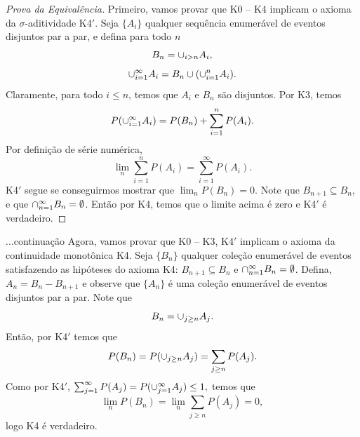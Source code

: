 %
%
%
\begin{frame}
\begin{proof}[Prova da Equivalência]
Primeiro, vamos provar que K0 -- K4 implicam o axioma da
$\sigma$-aditividade K4$'$. Seja $\{A_i\}$ qualquer sequência
enumerável de eventos disjuntos par a par, e defina para todo $n$
$$B_n=\cup_{i>n}A_i,$$
$$\cup_{i=1}^{\infty}A_i=B_n\cup(\cup_{i=1}^{n}A_i).$$
Claramente, para todo $i\leq n$, temos que $A_i$ e $B_n$ são
disjuntos. Por K3, temos
$$P(\cup_{i=1}^{\infty}A_i)=P(B_n)+\sum_{i=1}^{n}P(A_i).$$
Por definição de série numérica,
$$\lim_n\sum_{i=1}^{n}P(A_i)=\sum_{i=1}^{\infty}P(A_i).$$
K4$'$ segue se conseguirmos mostrar que $\lim_n P(B_n)=0.$ Note que
$B_{n+1}\subseteq B_n$, e que $\cap_{n=1}^{\infty}B_n=\emptyset$.
Então por K4, temos que o limite acima é zero e K4$'$ é verdadeiro.

\end{proof}
\end{frame}
%
\begin{frame}
\begin{block}{...continuação}
Agora, vamos provar que K0 -- K3, K4$'$ implicam o axioma da
continuidade monotônica K4. Seja $\{B_n\}$ qualquer coleção
enumerável de eventos satisfazendo as hipóteses do axioma K4:
$B_{n+1}\subseteq B_n$ e $\cap_{n=1}^{\infty}B_n=\emptyset$.
Defina, $A_n=B_n-B_{n+1}$ e observe que $\{A_n\}$ é uma coleção
enumerável de eventos disjuntos par a par. Note que
$$B_n=\cup_{j\geq n}A_j.$$
Então, por K4$'$ temos que
$$P(B_n)=P(\cup_{j\geq n}A_j)=\sum_{j\geq n}P(A_j).$$
Como por K4$'$,
$\sum_{j=1}^{\infty}P(A_j)=P(\cup_{j=1}^{\infty}A_j)\leq 1,$
temos que
$$\lim_n P(B_n)=\lim_n \sum_{j\geq n}P(A_j)=0,$$
logo K4 é verdadeiro.
\end{block}
\end{frame}
%
